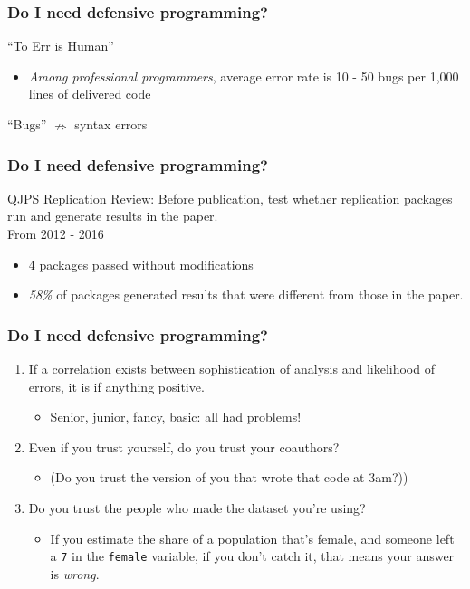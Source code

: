 \documentclass[11pt]{beamer}
\begin{document}
\begin{frame}\frametitle{Do I need defensive programming?}
\begin{center}
    \alert{``To Err is Human''}
\end{center}
\begin{itemize}
    \pause \item \emph{Among professional programmers}, average error rate is 10 - 50 bugs per 1,000 lines of delivered code \\
    {\color{gray}{Steve McConnell, 1993}}
\end{itemize}
``Bugs'' $\nRightarrow$ syntax errors
\end{frame}

\begin{frame}\frametitle{Do I need defensive programming?}
QJPS Replication Review: Before publication, test whether replication packages run and generate results in the paper. \\

\pause From 2012 - 2016
\begin{itemize}
    \pause \item 4 packages passed without modifications
    \pause \item \alert{\emph{58\%}} of packages generated results that were different from those in the paper.
\end{itemize}
\end{frame}

\begin{frame}[t]\frametitle{Do I need defensive programming?}
    \begin{enumerate}
        \pause \item If a correlation exists between sophistication of analysis and likelihood of errors, it is if anything positive.
        \begin{itemize}
            \item Senior, junior, fancy, basic: all had problems!
        \end{itemize}
        \pause \item Even if you trust yourself, do you trust your coauthors?
        \begin{itemize}
            \pause \item (Do you trust the version of you that wrote that code at 3am?))
        \end{itemize}
        \pause \item Do you trust the people who made the dataset you're using?
        \begin{itemize}
            \pause \item If you estimate the share of a population that's female, and someone left a \texttt{7} in the \texttt{female} variable, if you don't catch it, that means your answer is \emph{wrong}.
        \end{itemize}
    \end{enumerate}
\end{frame}
\end{document}
